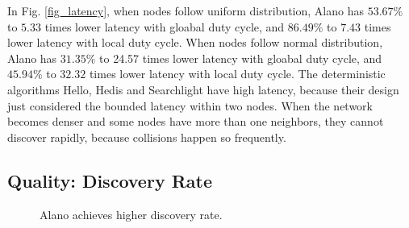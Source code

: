 In Fig. \ref{fig_latency}, when nodes follow uniform distribution, Alano has $53.67\%$ to $5.33$ times lower latency with gloabal duty cycle, and $86.49\%$ to $7.43$ times lower latency with local duty cycle. 
When nodes follow normal distribution, Alano has $31.35\%$ to 24.57 times lower latency with gloabal duty cycle, and $45.94\%$ to $32.32$ times lower latency with local duty cycle. 
The deterministic algorithms Hello, Hedis and Searchlight have high latency, because their design just considered the bounded latency within two nodes. When the network becomes denser and some nodes have more than one neighbors, they cannot discover rapidly, because collisions happen so frequently.


\subsection{Quality: Discovery Rate}

\begin{figure}[!h]

\hspace{0.01in}
\hspace{0.01in}
\hspace{0.01in}
\caption{Alano achieves higher discovery rate.}
\label{fig_timerate}
\end{figure}


